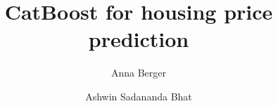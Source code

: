 \documentclass[format=acmsmall, review=false, screen=true]{acmart}
\begin{document}
\title{CatBoost for housing price prediction}

\author{Anna Berger}

\author{Ashwin Sadananda Bhat}





\maketitle
\thispagestyle{plain}











 


\end{document}
